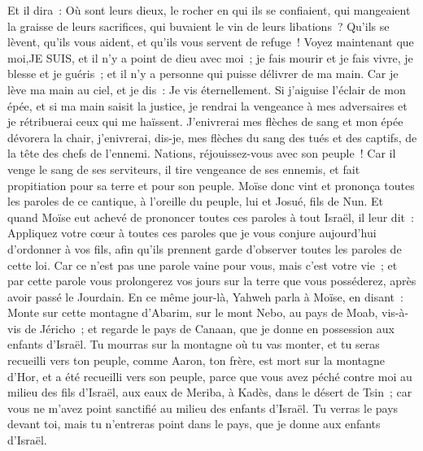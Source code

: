 \begin{multicols}{2}
Et il dira~: Où sont leurs dieux, le rocher en qui ils se confiaient,
qui mangeaient la graisse de leurs sacrifices, qui buvaient le vin de leurs libations~? Qu'ils se lèvent, qu'ils vous aident, et qu'ils vous servent de refuge~!
Voyez maintenant que moi,JE SUIS, et il n'y a point de dieu avec moi~; je fais mourir et je fais vivre, je blesse et je guéris~; et il n'y a personne qui puisse délivrer de ma main.
Car je lève ma main au ciel, et je dis~: Je vis éternellement.
Si j'aiguise l'éclair de mon épée, et si ma main saisit la justice, je rendrai la vengeance à mes adversaires et je rétribuerai ceux qui me haïssent.
 J'enivrerai mes flèches de sang et mon épée dévorera la chair, j'enivrerai, dis-je, mes flèches du sang des tués et des captifs, de la tête des chefs de l'ennemi.
Nations, réjouissez-vous avec son peuple~! Car il venge le sang de ses serviteurs, il tire vengeance de ses ennemis, et fait propitiation pour sa terre et pour son peuple.
Moïse donc vint et prononça toutes les paroles de ce cantique, à l'oreille du peuple, lui et Josué, fils de Nun.
Et quand Moïse eut achevé de prononcer toutes ces paroles à tout Israël,
il leur dit~: Appliquez votre cœur à toutes ces paroles que je vous conjure aujourd'hui d'ordonner à vos fils, afin qu'ils prennent garde d'observer toutes les paroles de cette loi.
Car ce n'est pas une parole vaine pour vous, mais c'est votre vie~; et par cette parole vous prolongerez vos jours sur la terre que vous posséderez, après avoir passé le Jourdain.
En ce même jour-là, Yahweh parla à Moïse, en disant~:
Monte sur cette montagne d'Abarim, sur le mont Nebo, au pays de Moab, vis-à-vis de Jéricho~; et regarde le pays de Canaan, que je donne en possession aux enfants d'Israël.
Tu mourras sur la montagne où tu vas monter, et tu seras recueilli vers ton peuple, comme Aaron, ton frère, est mort sur la montagne d'Hor, et a été recueilli vers son peuple,
parce que vous avez péché contre moi au milieu des fils d'Israël, aux eaux de Meriba, à Kadès, dans le désert de Tsin~; car vous ne m'avez point sanctifié au milieu des enfants d'Israël.
Tu verras le pays devant toi, mais tu n'entreras point dans le pays, que je donne aux enfants d'Israël.

\end{multicols}
